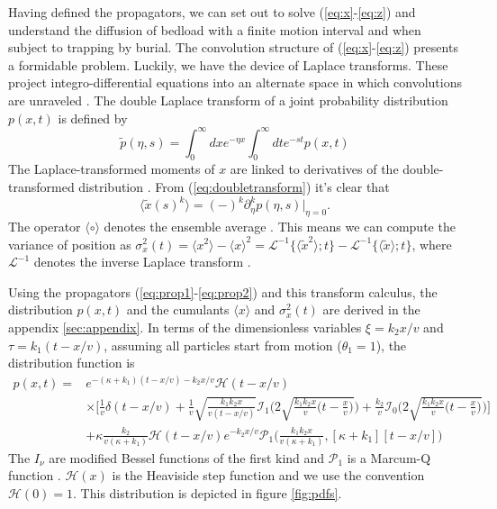\documentclass[]{agujournal2018}
\newcommand\be{\begin{equation}}
\newcommand\ee{\end{equation}}
\newcommand\bra{\langle}
\newcommand\ket{\rangle}
\newcommand\El{\mathcal{L}}
\begin{document}
Having defined the propagators, we can set out to solve (\ref{eq:x}-\ref{eq:z}) and understand the diffusion of bedload with a finite motion interval and when subject to trapping by burial.
The convolution structure of (\ref{eq:x}-\ref{eq:z}) presents a formidable problem.
Luckily, we have the device of Laplace transforms.
These project integro-differential equations into an alternate space in which convolutions are unraveled \citep[e.g.][]{Arfken1985}.
The double Laplace transform of a joint probability distribution $p(x,t)$ is defined by 
\be \tilde{p}(\eta,s) = \int_0^\infty dx e^{-\eta x}\int_0^\infty dt e^{-st} p(x,t) \label{eq:doubletransform}\ee
The Laplace-transformed moments of $x$ are linked to derivatives of the double-transformed distribution \citep[e.g.][]{Weeks1998}.
From (\ref{eq:doubletransform}) it's clear that
\be \bra \tilde{x}(s)^k \ket = (-)^k\partial_\eta^k p(\eta,s)\Big|_{\eta=0}.\ee
The operator $\bra \circ \ket$ denotes the ensemble average \citep[e.g.][]{Kittel1958}.
This means we can compute the variance of position as $\sigma_x^2(t) = \bra x^2 \ket - \bra x \ket^2 = \El^{-1} \Big\{\bra\tilde{x}^2 \ket;t\Big\} - \El^{-1} \Big\{\bra\tilde{x} \ket;t\Big\}$, where $\El^{-1}$ denotes the inverse Laplace transform \citep[e.g.][]{Arfken1985}.



Using the propagators (\ref{eq:prop1}-\ref{eq:prop2}) and this transform calculus, the distribution $p(x,t)$ and the cumulants $\bra x \ket$ and $\sigma_x^2(t)$ are derived in the appendix \ref{sec:appendix}. In terms of the dimensionless variables $\xi = k_2 x/v$ and $\tau = k_1(t-x/v)$, assuming all particles start from motion ($\theta_1=1$), the distribution function is 
\begin{align}
p(x,t) = &e^{-(\kappa + k_1)(t-x/v)-k_2x/v} \mathcal{H}(t-x/v)\\
&\times \Bigg[\frac{1}{v}\delta(t-x/v) + \frac{1}{v}\sqrt{\frac{k_1k_2x}{v(t-x/v)}}\mathcal{I}_1\Bigg(2\sqrt{\frac{k_1k_2x}{v}\Big(t-\frac{x}{v}\Big)}\Bigg) +\frac{k_2}{v}\mathcal{I}_0\Bigg(2\sqrt{\frac{k_1k_2x}{v}\Big(t-\frac{x}{v}\Big)}\Bigg) \Bigg]\\
&+ \kappa\frac{ k_2}{v(\kappa+k_1)}\mathcal{H}(t-x/v)e^{-k_2x/v}\mathcal{P}_1\Big(\frac{k_1k_2x}{v(\kappa+k_1)},[\kappa+k_1][t-x/v] \Big)
\label{eq:pdf}
\end{align}
The $I_\nu$ are modified Bessel functions of the first kind and $\mathcal{P}_1$ is a Marcum-Q function \citep{Marcum1960,Temme1996}. $\mathcal{H}(x)$ is the Heaviside step function and we use the convention $\mathcal{H}(0)=1$.
This distribution is depicted in figure \ref{fig:pdfs}.
\end{document}
